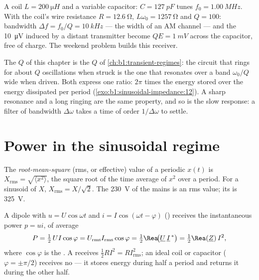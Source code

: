 \begin{example}\label{ex:b1:sinusoidal-impedance:radio}
A coil $L = \qty{200}{\micro H}$ and a variable capacitor: $C =
\qty{127}{pF}$ tunes $f_0 = \qty{1.00}{MHz}$. With the coil's wire
resistance $R = \qty{12.6}{\ohm}$, $L\omega_0 = \qty{1257}{\ohm}$ and
$Q = 100$: bandwidth $\Delta f = f_0/Q = \qty{10}{kHz}$ --- the width of
an AM channel --- and the \qty{10}{\micro V} induced by a distant
transmitter become $QE = \qty{1}{mV}$ across the capacitor, free of
charge. The weekend problem builds this receiver.
\end{example}

\begin{remark}\label{rem:b1:sinusoidal-impedance:Q}
The $Q$ of this chapter is the $Q$ of \cref{ch:b1:transient-regimes}:
the circuit that rings for about $Q$ oscillations when struck is the
one that resonates over a band $\omega_0/Q$ wide when driven. Both
express one ratio: $2\pi$ times the energy stored over the energy
dissipated per period (\cref{exo:b1:sinusoidal-impedance:12}). A
sharp resonance and a long ringing are the same property, and so is the
slow response: a filter of bandwidth $\Delta\omega$ takes a time of
order $1/\Delta\omega$ to settle.
\end{remark}

\section{Power in the sinusoidal regime}

\begin{definition}\label{def:b1:sinusoidal-impedance:rms}
The \emph{root-mean-square} (rms, or effective) value of a periodic
 $x(t)$ is $X_{\mathrm{rms}} = \sqrt{\langle x^2\rangle}$, the
square root of the time average of $x^2$ over a period. For a sinusoid
of  $X$, $X_{\mathrm{rms}} = X/\sqrt2$. The \qty{230}{V} of the
mains is an rms value; its  is \qty{325}{V}.
\end{definition}

\begin{theorem}\label{thm:b1:sinusoidal-impedance:power}
A dipole with $u = U\cos\omega t$ and $i = I\cos(\omega t - \varphi)$
() receives the instantaneous power $p = ui$, of
average
\[
P = \tfrac12\,UI\cos\varphi = U_{\mathrm{rms}}I_{\mathrm{rms}}\cos\varphi
= \tfrac12\Rea\!\big(\underline U\,\underline I^{\,*}\big) = \tfrac12\Rea(\underline Z)\,I^2,
\]
where $\cos\varphi$ is the \emph{}. A  receives
$\tfrac12 RI^2 = RI_{\mathrm{rms}}^2$; an ideal coil or capacitor
($\varphi = \pm\pi/2$) receives no  --- it stores energy
during half a period and returns it during the other half.
\end{theorem}

